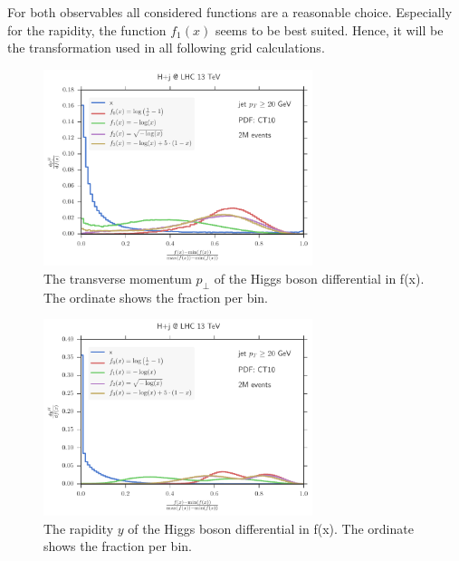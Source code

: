 For both observables all considered functions are a reasonable choice.
Especially for the rapidity, the function $f_1(x)$ seems to be best suited.
Hence, it will be the transformation used in all following grid calculations.
%
\begin{figure}[]
	\includegraphics[width=0.7\textwidth]{images/hpt_compare.pdf}
	\caption{The transverse momentum $p_\perp$ of the Higgs boson differential in f(x).
				The ordinate shows the fraction per bin.}
	\label{fig:hpt_compare}
\end{figure}
%
\begin{figure}[]
	\includegraphics[width=0.7\textwidth]{images/hy_compare.pdf}
	\caption{The rapidity $y$ of the Higgs boson differential in f(x).
				The ordinate shows the fraction per bin.}
	\label{fig:hy_compare}
\end{figure}
%
